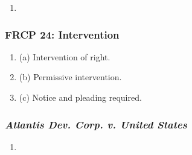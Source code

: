 \begin{enumerate}
    \item 
\end{enumerate}

\subsubsection{FRCP 24: Intervention}

\begin{enumerate}
    \item (a) Intervention of right.
    \item (b) Permissive intervention.
    \item (c) Notice and pleading required.
\end{enumerate}

\subsubsection{\emph{Atlantis Dev. Corp. v. United States}}

\begin{enumerate}
    \item 
\end{enumerate}
